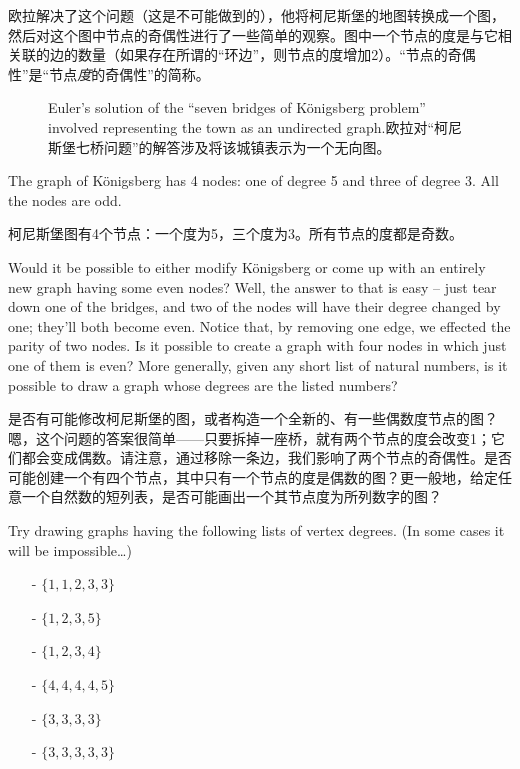 欧拉解决了这个问题（这是不可能做到的），他将柯尼斯堡的地图转换成一个图，然后对这个图中节点的奇偶性进行了一些简单的观察。图中一个节点的度是与它相关联的边的数量（如果存在所谓的“环边”，则节点的度增加2）。“节点的奇偶性”是“节点\emph{度}的奇偶性”的简称。

\begin{figure}[!hbtp]
\begin{center}

\end{center}
\caption[K\"{o}nigsberg, Prussia as a graph.普鲁士柯尼斯堡的图表示。]{Euler's solution of the ``seven
bridges of K\"{o}nigsberg problem'' involved representing the town
as an undirected graph.欧拉对“柯尼斯堡七桥问题”的解答涉及将该城镇表示为一个无向图。}
\label{fig:kon_graph} 
\end{figure}

The graph of K\"{o}nigsberg has 4 nodes: one of degree 5 and three of degree
3.  All the nodes are odd.

柯尼斯堡图有4个节点：一个度为5，三个度为3。所有节点的度都是奇数。

Would it be possible to either modify 
K\"{o}nigsberg or come up with an entirely new graph having some even nodes?
Well, the answer to that is easy -- just tear down one of the bridges, and two
of the nodes will have their degree changed by one; they'll both become even.
Notice that, by removing one edge, we effected the parity of two nodes.  Is
it possible to create a graph with four nodes in which just one of them is
even?  More generally, given any short list of natural numbers, is it 
possible to draw a graph whose degrees are the listed numbers?

是否有可能修改柯尼斯堡的图，或者构造一个全新的、有一些偶数度节点的图？嗯，这个问题的答案很简单——只要拆掉一座桥，就有两个节点的度会改变1；它们都会变成偶数。请注意，通过移除一条边，我们影响了两个节点的奇偶性。是否可能创建一个有四个节点，其中只有一个节点的度是偶数的图？更一般地，给定任意一个自然数的短列表，是否可能画出一个其节点度为所列数字的图？

\begin{exer}
Try drawing graphs having the following lists of vertex degrees.
(In some cases it will be impossible\ldots)

\begin{itemize}
\item[-] $\{1,1,2,3,3\}$
\item[-] $\{1,2,3,5\}$
\item[-] $\{1,2,3,4\}$
\item[-] $\{4,4,4,4,5\}$
\item[-] $\{3,3,3,3\}$
\item[-] $\{3,3,3,3,3\}$
\end{itemize}
\end{exer}   

